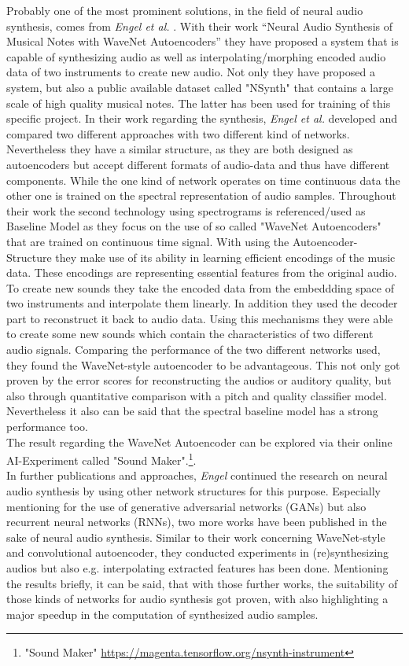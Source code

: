Probably one of the most prominent solutions, in the field of neural audio synthesis, comes from \textit{Engel et al.} \cite{Engel2017}. With their work “Neural Audio Synthesis of Musical Notes with WaveNet Autoencoders” they have proposed a system that is capable of synthesizing audio as well as interpolating/morphing encoded audio data of two instruments to create new audio. Not only they have proposed a system, but also a public available dataset called "NSynth" that contains a large scale of high quality musical notes. The latter has been used for training of this specific project. In their work regarding the synthesis, \textit{Engel et al.} developed and compared two different approaches with two different kind of networks. Nevertheless they have a similar structure, as they are both designed as autoencoders but accept different formats of audio-data and thus have different components. While the one kind of network operates on time continuous data the other one is trained on the spectral representation of audio samples. Throughout their work the second technology using spectrograms is referenced/used as Baseline Model as they focus on the use of so called "WaveNet Autoencoders" that are trained on continuous time signal. With using the Autoencoder-Structure they make use of its ability in learning efficient encodings of the music data. These encodings are representing essential features from the original audio. To create new sounds they take the encoded data from the embeddding space of two instruments and interpolate them linearly. In addition they used the decoder part to reconstruct it back to audio data. Using this mechanisms they were able to create some new sounds which contain the characteristics of two different audio signals. Comparing the performance of the two different networks used, they found the WaveNet-style autoencoder to be advantageous. This not only got proven by the error scores for reconstructing the audios or auditory quality, but also through quantitative comparison with a pitch and quality classifier model. Nevertheless it also can be said that the spectral baseline model has a strong performance too.\\
The result regarding the WaveNet Autoencoder can be explored via their online AI-Experiment called "Sound Maker".\footnote{"Sound Maker" \url{https://magenta.tensorflow.org/nsynth-instrument}}.\\

In further publications and approaches, \textit{Engel} continued the research on neural audio synthesis by using other network structures for this purpose. Especially mentioning for the use of generative adversarial networks (GANs) but also recurrent neural networks (RNNs), two more works have been published in the sake of neural audio synthesis. \cite{Engel2019, hantrakul2019fast} Similar to their work concerning WaveNet-style and convolutional autoencoder, they conducted experiments in (re)synthesizing audios but also e.g. interpolating extracted features has been done. Mentioning the results briefly, it can be said, that with those further works, the suitability of those kinds of networks for audio synthesis got proven, with also highlighting a major speedup in the computation of synthesized audio samples.\\

